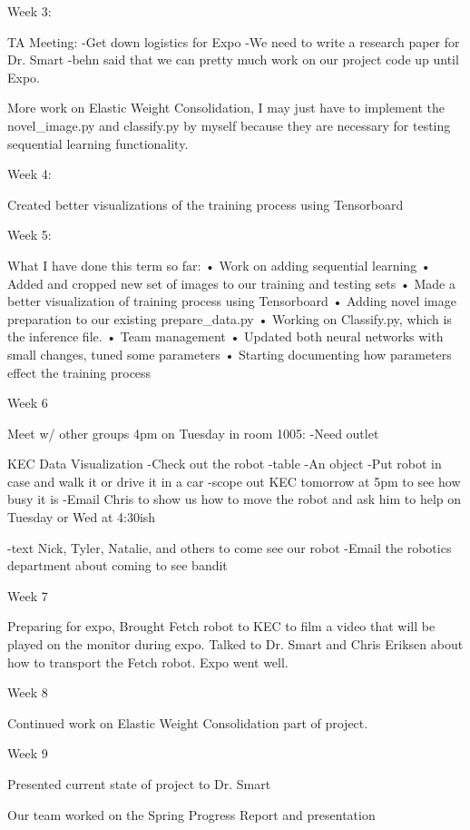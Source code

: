 \documentclass[draftclsnofoot, onecolumn, 10pt, compsoc]{IEEEtran}
\begin{document}
Week 3:

  TA Meeting:
  -Get down logistics for Expo
  -We need to write a research paper for Dr. Smart
  -behn said that we can pretty much work on our project code up until Expo.

  More work on Elastic Weight Consolidation, I may just have to implement the novel\_image.py and classify.py by myself because they are necessary for testing sequential learning functionality.


Week 4:

  Created better visualizations of the training process using Tensorboard


Week 5:

  What I have done this term so far:
  •	Work on adding sequential learning
  •	Added and cropped new set of images to our training and testing sets
  •	Made a better visualization of training process using Tensorboard
  •	Adding novel image preparation to our existing prepare\_data.py
  •	Working on Classify.py, which is the inference file.
  •	Team management
  •	Updated both neural networks with small changes, tuned some parameters
  •	Starting documenting how parameters effect the training process


Week 6

  Meet w/ other groups 4pm on Tuesday in room 1005:
  -Need outlet

  KEC Data Visualization
  -Check out the robot
  -table
  -An object
  -Put robot in case and walk it or drive it in a car
  -scope out KEC tomorrow at 5pm to see how busy it is
  -Email Chris to show us how to move the robot and ask him to help on Tuesday or Wed at 4:30ish

  -text Nick, Tyler, Natalie, and others to come see our robot
  -Email the robotics department about coming to see bandit

Week 7

  Preparing for expo,
  Brought Fetch robot to KEC to film a video that will be played on the monitor during expo. Talked to Dr. Smart and Chris Eriksen about how to transport the Fetch robot.
  Expo went well.

Week 8

  Continued work on Elastic Weight Consolidation part of project. 

Week 9

  Presented current state of project to Dr. Smart

  Our team worked on the Spring Progress Report and presentation
\end{document}
